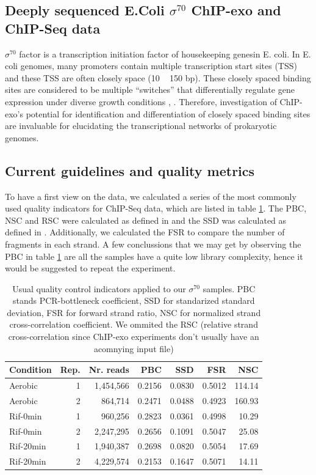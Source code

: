 \documentclass{bmcart}\usepackage[]{graphicx}\usepackage[]{color}
\begin{document}
\subsection{Deeply sequenced E.Coli $\sigma^{70}$ ChIP-exo and ChIP-Seq data}
\label{sec:ourdata}

$\sigma^{70}$ factor is a transcription initiation factor of
housekeeping genesin E. coli. In E. coli genomes, many promoters
contain multiple transcription start sites (TSS) and these TSS are
often closely space (10 ~ 150 bp). These closely spaced binding sites
are considered to be multiple ``switches'' that differentially
regulate gene expression under diverse growth conditions
\cite{regdb_old}, \cite{regulondb}. Therefore, investigation of
ChIP-exo's potential for identification and differentiation of closely
spaced binding sites are invaluable for elucidating the
transcriptional networks of prokaryotic genomes.

\subsection{Current guidelines and quality metrics}
\label{sec:qcnow}

To have a first view on the data, we calculated a series of the most
commonly used quality indicators for ChIP-Seq data, which are listed
in table \ref{tab:qcbase}. The PBC, NSC and RSC were calculated as
defined in \cite{encode_qc} and the SSD was calculated as defined in
\cite{htseq}. Additionally, we calculated the FSR to compare the
number of fragments in each strand. A few conclussions that we may get
by observing the PBC in table \ref{tab:qcbase} are all the samples
have a quite low library complexity, hence it would be suggested to
repeat the experiment.  

\begin{table}[h]
  \centering
\begin{tabular}{l|r|r|r|r|r|r}
\hline\hline
Condition & Rep. & Nr. reads & PBC & SSD & FSR & NSC  \\
\hline\hline
Aerobic & 1 & 1,454,566 & 0.2156 & 0.0830 & 0.5012 & 114.14 \\
\hline
Aerobic & 2 & 864,714 & 0.2471 & 0.0488 & 0.4923 & 160.93  \\
\hline
Rif-0min & 1 & 960,256 & 0.2823 & 0.0361 & 0.4998 & 10.29 \\
\hline
Rif-0min & 2 & 2,247,295 & 0.2656 & 0.1091 & 0.5047 &  25.08  \\
\hline
Rif-20min & 1 & 1,940,387 & 0.2698 & 0.0820 & 0.5054 & 17.69  \\
\hline
Rif-20min & 2 & 4,229,574 & 0.2153 & 0.1647 & 0.5071 &  14.11 \\
\hline
\end{tabular}  
  \caption{Usual quality control indicators applied to our
    $\sigma^{70}$ samples. PBC stands PCR-bottleneck coefficient, SSD
    for standarized standard deviation, FSR for forward strand ratio,
    NSC for normalized strand cross-correlation coefficient. We
    ommited the RSC (relative strand cross-correlation since ChIP-exo
    experiments don't usually have an acomnying input file)}

  \label{tab:qcbase}
\end{table}
\end{document}

